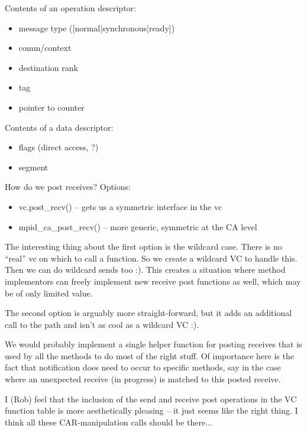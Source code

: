 \documentclass[11pt,letterpaper]{article}
\begin{document}
Contents of an operation descriptor:
\begin{itemize}
\item message type ([normal|synchronous|ready])
\item comm/context
\item destination rank
\item tag
\item pointer to counter
\end{itemize}

Contents of a data descriptor:
\begin{itemize}
\item flags (direct access, ?)
\item segment
\end{itemize}


How do we post receives?  Options:
\begin{itemize}
\item vc.post\_recv() -- gets us a symmetric interface in the vc
\item mpid\_ca\_post\_recv() -- more generic, symmetric at the CA level
\end{itemize}

The interesting thing about the first option is the wildcard case.  There is no
``real'' vc on which to call a function.  So we create a wildcard VC to handle
this.  Then we can do wildcard sends too :).  This creates a situation where
method implementors can freely implement new receive post functions as well,
which may be of only limited value.

The second option is arguably more straight-forward, but it adds an additional
call to the path and isn't as cool as a wildcard VC :).

%
%
We would probably implement a single helper function for posting receives that
is used by all the methods to do most of the right stuff.  Of importance here
is the fact that notification does need to occur to specific methods, say in
the case where an unexpected receive (in progress) is matched to this posted
receive.

I (Rob) feel that the inclusion of the send and receive post operations in the
VC function table is more aesthetically pleasing -- it just seems like the
right thing.  I think all these CAR-manipulation calls should be there...
\end{document}
